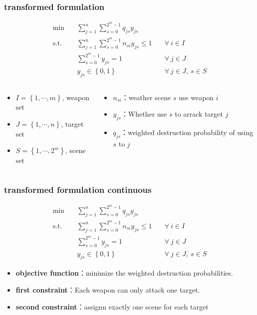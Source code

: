 \documentclass[CJK,10pt]{beamer}
\newcommand{\sumFromTo}[3]{\ensuremath{\sum_{#1}^{#2} #3}}
\newcommand{\optimalProblem}[3]
{\begin{align*}
    #1 \quad &#2 \\
    \mathrm{s. t.}\quad&#3
\end{align*}}
\begin{document}
\begin{frame}
    \frametitle{transformed formulation}
    \optimalProblem{\min}{\sumFromTo{j = 1}{n}{\sumFromTo{s = 0}{2^m -1}{q_{js}y_{js}}}\tag{CG}}{\sumFromTo{j = 1}{n}{\sumFromTo{s = 0}{2^m -1}{n_{si}y_{js}}}\leq 1 \quad &\forall ~ i \in I\\& \sumFromTo{s = 0}{2^m - 1}{y_{js}} = 1 \quad &\forall ~ j \in J\\& y_{js} \in \left\{ 0,1 \right\} &\forall ~ j\in J,\ s\in S}
    \begin{columns}
        \begin{column}{.55\linewidth}
            \footnotesize
            \begin{itemize}
                \item $I = \left\{1,\cdots,m\right\} $, weapon set
                \item $J = \left\{1,\cdots,n\right\} $, target set
                \item $S = \left\{1,\cdots,2^m\right\}$, scene set
            \end{itemize}
        \end{column}
    \hspace{-3cm}
        \begin{column}{.55\linewidth}
            \footnotesize
            \begin{itemize}
                \item $n_{si}$：weather scene $s$ use weapon $i$
                \item $y_{js}$：Whether use $s$ to arrack target $j$
                \item $q_{js}$：weighted destruction probability of using $s$ to $j$
            \end{itemize}
        \end{column}
    \end{columns}
\end{frame}

\begin{frame}
    \frametitle{transformed formulation continuous}
    \optimalProblem{\min}{\sumFromTo{j = 1}{n}{\sumFromTo{s = 0}{2^m -1}{q_{js}y_{js}}}\tag{CG}}{\sumFromTo{j = 1}{n}{\sumFromTo{s = 0}{2^m -1}{n_{si}y_{js}}}\leq 1 \quad &\forall ~ i \in I\\& \sumFromTo{s = 0}{2^m - 1}{y_{js}} = 1 \quad &\forall ~ j \in J\\& y_{js} \in \left\{ 0,1 \right\} & \forall ~ j\in J,\ s\in S}
    \begin{itemize}
        \item \textbf{objective function}：minimize the weighted destruction probabilities.
        \item \textbf{first constraint}：Each weapon can only attack one target.
        \item \textbf{second constraint}：assignn exactly one scene for each target
    \end{itemize}
\end{frame}
\end{document}
